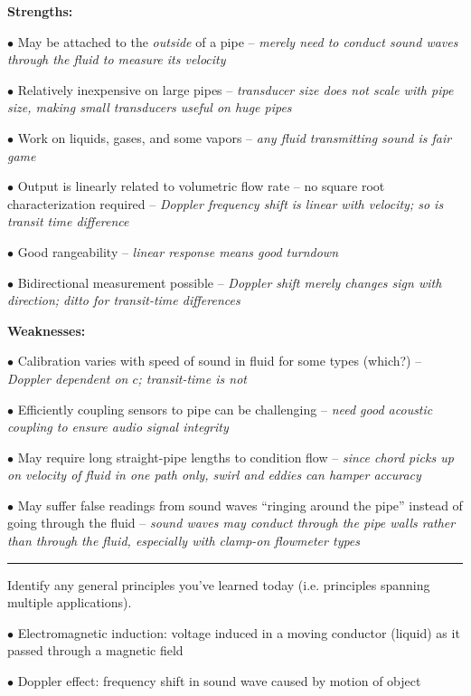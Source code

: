 {\bf Strengths:}

\medskip
\item{$\bullet$} May be attached to the {\it outside} of a pipe -- {\it merely need to conduct sound waves through the fluid to measure its velocity}
\item{$\bullet$} Relatively inexpensive on large pipes -- {\it transducer size does not scale with pipe size, making small transducers useful on huge pipes}
\item{$\bullet$} Work on liquids, gases, and some vapors -- {\it any fluid transmitting sound is fair game}
\item{$\bullet$} Output is linearly related to volumetric flow rate -- no square root characterization required -- {\it Doppler frequency shift is linear with velocity; so is transit time difference}
\item{$\bullet$} Good rangeability -- {\it linear response means good turndown}
\item{$\bullet$} Bidirectional measurement possible -- {\it Doppler shift merely changes sign with direction; ditto for transit-time differences}
\medskip

\vskip 10pt

{\bf Weaknesses:}

\medskip
\item{$\bullet$} Calibration varies with speed of sound in fluid for some types (which?) -- {\it Doppler dependent on $c$; transit-time is not}
\item{$\bullet$} Efficiently coupling sensors to pipe can be challenging -- {\it need good acoustic coupling to ensure audio signal integrity}
\item{$\bullet$} May require long straight-pipe lengths to condition flow -- {\it since chord picks up on velocity of fluid in one path only, swirl and eddies can hamper accuracy}
\item{$\bullet$} May suffer false readings from sound waves ``ringing around the pipe'' instead of going through the fluid -- {\it sound waves may conduct through the pipe walls rather than through the fluid, especially with clamp-on flowmeter types}
\medskip


\filbreak \vskip 5pt \hrule \vskip 5pt  \vskip 10pt

\noindent
Identify any general principles you've learned today (i.e. principles spanning multiple applications).
\item{$\bullet$} Electromagnetic induction: voltage induced in a moving conductor (liquid) as it passed through a magnetic field
\item{$\bullet$} Doppler effect: frequency shift in sound wave caused by motion of object
\medskip

